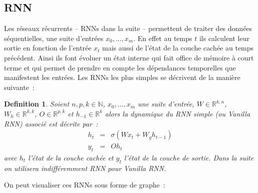\documentclass[11pt]{scrartcl} %
\newtheorem{Def}[theorem]{Definition}
\newcommand{\N}{\mathbb{N}}
\newcommand{\R}{\mathbb{R}}
\begin{document}
\subsection{RNN}
Les réseaux récurrents – RNNs dans la suite – permettent de traiter des données séquentielles, une suite d’entrées $x_0, . . . ,x_m$. En effet au temps $t$ ils calculent leur sortie en fonction de l’entrée $x_t$ mais aussi de l’état de la couche cachée au temps précédent. Ainsi ils font évoluer un état interne qui fait office de mémoire à court terme et qui permet de prendre en compte les dépendances temporelles que manifestent les entrées. Les RNNs les plus simples se décrivent de la manière suivante~:
\begin{Def}\label{VanillaRNN}
Soient $n,p,k\in \N$, $x_0,...,x_m$ une suite d'entrée, $W\in \R^{k,n}$, $W_h\in \R^{k,k}$, $O\in \R^{p,k}$ et $h_{-1}\in\R^k$ alors la dynamique du RNN simple (ou Vanilla RNN) associé est décrite par~:
\begin{eqnarray}
h_t &=& \sigma(Wx_t+W_gh_{t-1})\\
y_t&=&Oh_t
\end{eqnarray}
avec $h_t$ l'état de la couche cachée et $y_t$ l'état de la couche de sortie. Dans la suite on utilisera indifféremment RNN pour \textit{Vanilla RNN}.
\end{Def}
On peut visualiser ces RNNs sous forme de graphe~:
\end{document}
